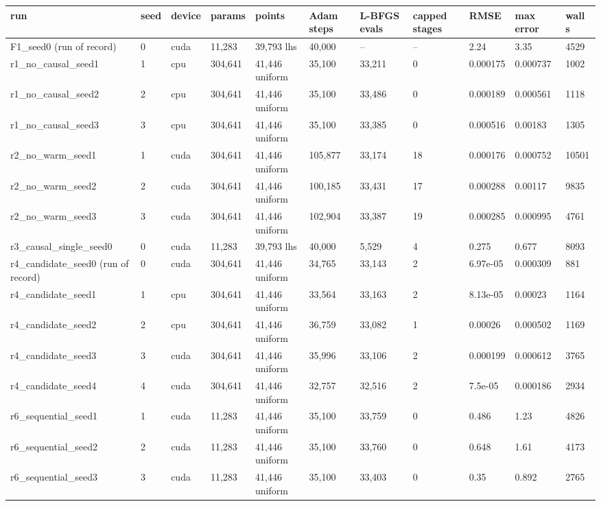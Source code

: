 \begin{table}[htbp]
\centering
\begin{tabular}{lllllllllll}
\toprule
run & seed & device & params & points & Adam steps & L-BFGS evals & capped stages & RMSE & max error & wall s \\
\midrule
F1\_seed0 (run of record) & 0 & cuda & 11,283 & 39,793 lhs & 40,000 & -- & -- & 2.24 & 3.35 & 4529 \\
r1\_no\_causal\_seed1 & 1 & cpu & 304,641 & 41,446 uniform & 35,100 & 33,211 & 0 & 0.000175 & 0.000737 & 1002 \\
r1\_no\_causal\_seed2 & 2 & cpu & 304,641 & 41,446 uniform & 35,100 & 33,486 & 0 & 0.000189 & 0.000561 & 1118 \\
r1\_no\_causal\_seed3 & 3 & cpu & 304,641 & 41,446 uniform & 35,100 & 33,385 & 0 & 0.000516 & 0.00183 & 1305 \\
r2\_no\_warm\_seed1 & 1 & cuda & 304,641 & 41,446 uniform & 105,877 & 33,174 & 18 & 0.000176 & 0.000752 & 10501 \\
r2\_no\_warm\_seed2 & 2 & cuda & 304,641 & 41,446 uniform & 100,185 & 33,431 & 17 & 0.000288 & 0.00117 & 9835 \\
r2\_no\_warm\_seed3 & 3 & cuda & 304,641 & 41,446 uniform & 102,904 & 33,387 & 19 & 0.000285 & 0.000995 & 4761 \\
r3\_causal\_single\_seed0 & 0 & cuda & 11,283 & 39,793 lhs & 40,000 & 5,529 & 4 & 0.275 & 0.677 & 8093 \\
r4\_candidate\_seed0 (run of record) & 0 & cuda & 304,641 & 41,446 uniform & 34,765 & 33,143 & 2 & 6.97e-05 & 0.000309 & 881 \\
r4\_candidate\_seed1 & 1 & cpu & 304,641 & 41,446 uniform & 33,564 & 33,163 & 2 & 8.13e-05 & 0.00023 & 1164 \\
r4\_candidate\_seed2 & 2 & cpu & 304,641 & 41,446 uniform & 36,759 & 33,082 & 1 & 0.00026 & 0.000502 & 1169 \\
r4\_candidate\_seed3 & 3 & cuda & 304,641 & 41,446 uniform & 35,996 & 33,106 & 2 & 0.000199 & 0.000612 & 3765 \\
r4\_candidate\_seed4 & 4 & cuda & 304,641 & 41,446 uniform & 32,757 & 32,516 & 2 & 7.5e-05 & 0.000186 & 2934 \\
r6\_sequential\_seed1 & 1 & cuda & 11,283 & 41,446 uniform & 35,100 & 33,759 & 0 & 0.486 & 1.23 & 4826 \\
r6\_sequential\_seed2 & 2 & cuda & 11,283 & 41,446 uniform & 35,100 & 33,760 & 0 & 0.648 & 1.61 & 4173 \\
r6\_sequential\_seed3 & 3 & cuda & 11,283 & 41,446 uniform & 35,100 & 33,403 & 0 & 0.35 & 0.892 & 2765 \\
\bottomrule
\end{tabular}
\end{table}


